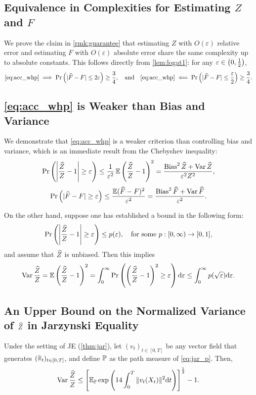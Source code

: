 \subsection{Equivalence in Complexities for Estimating $Z$ and $F$}
We prove the claim in \cref{rmk:guarantee} that estimating $Z$ with $O(\varepsilon)$ relative error and estimating $F$ with $O(\varepsilon)$ absolute error share the same complexity up to absolute constants. This follows directly from \cref{lem:logat1}: for any $\varepsilon\in\ro{0,\frac{1}{2}}$,
$$\mbox{\cref{eq:acc_whp}}\implies\prob\ro{|\Fh-F|\le2\varepsilon}\ge\frac{3}{4},\quad\text{and}\quad\mbox{\cref{eq:acc_whp}}\impliedby\prob\ro{|\Fh-F|\le\frac{\varepsilon}{2}}\ge\frac{3}{4}.$$

\subsection{\cref{eq:acc_whp} is Weaker than Bias and Variance}
We demonstrate that \cref{eq:acc_whp} is a weaker criterion than controlling bias and variance, which is an immediate result from the Chebyshev inequality:
$$\prob\ro{\abs{\frac{\Zh}{Z}-1}\ge\varepsilon}\le\frac{1}{\varepsilon^2}\E\ro{\frac{\Zh}{Z}-1}^2=\frac{\bias^2\Zh+\var\Zh}{\varepsilon^2Z^2},$$
$$\prob\ro{|\Fh-F|\ge\varepsilon}\le\frac{\E(\Fh-F)^2}{\varepsilon^2}=\frac{\bias^2\Fh+\var\Fh}{\varepsilon^2}.$$

On the other hand, suppose one has established a bound in the following form: 
$$\prob\ro{\abs{\frac{\Zh}{Z}-1}\ge\varepsilon}\le p(\varepsilon),\quad\text{for some}~p:[0,\infty)\to[0,1],$$
and assume that $\Zh$ is unbiased. Then this implies
$$\var\frac{\Zh}{Z}=\E\ro{\frac{\Zh}{Z}-1}^2=\int_0^\infty\prob\ro{\ro{\frac{\Zh}{Z}-1}^2\ge\varepsilon}\d\varepsilon\le\int_0^\infty p(\sqrt\varepsilon)\d\varepsilon.$$

\subsection{An Upper Bound on the Normalized Variance of $\Zh$ in Jarzynski Equality}
\begin{proposition}
    Under the setting of JE (\cref{thm:jar}), let $(v_t)_{t\in[0,T]}$ be any vector field that generates $(\pit_t)_{t\in[0,T]}$, and define $\P$ as the path measure of \cref{eq:jar_p}. Then, 
    $$\var\frac{\Zh}{Z}\le\sq{\E_\P\exp\ro{14\int_0^T\|v_t(X_t)\|^2\d t}}^\frac{1}{2}-1.$$
    \label{thm:jar_var}
\end{proposition}

